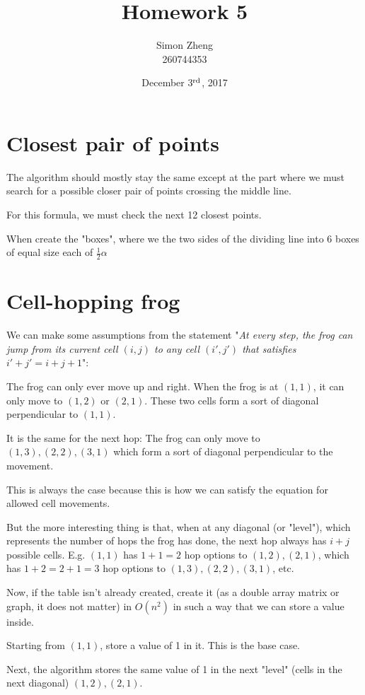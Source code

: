 \documentclass[11pt,letterpaper]{article}
\author{Simon Zheng\\260744353}
\title{Homework 5}
\date{December 3$^{\textnormal{rd}}$, 2017}
\begin{document}
	\maketitle
	\thispagestyle{fancy}
	
	\section{Closest pair of points}
		The algorithm should mostly stay the same except at the part where we must search for a possible closer pair of points crossing the middle line.
		
		For this formula, we must check the next 12 closest points.
		
		When create the "boxes", where we the two sides of the dividing line into 6 boxes of equal size each of $\frac{1}{2}\alpha$
	
	\section{Cell-hopping frog}
		We can make some assumptions from the statement "\textit{At every step, the frog can jump from its current cell $(i, j)$ to any cell $(i\prime , j\prime)$ that satisfies $i\prime + j\prime = i + j + 1$}":
		
		The frog can only ever move up and right.
		When the frog is at $(1,1)$, it can only move to $(1,2)$ or $(2,1)$. These two cells form a sort of diagonal perpendicular to $(1,1)$.
		
		It is the same for the next hop:
		The frog can only move to $(1,3), (2,2), (3,1)$ which form a sort of diagonal perpendicular to the movement.
		
		This is always the case because this is how we can satisfy the equation for allowed cell movements.
		
		But the more interesting thing is that, when at any diagonal (or "level"), which represents the number of hops the frog has done, the next hop always has $i + j$ possible cells. E.g. $(1,1)$ has $1+1=2$ hop options to $(1,2), (2,1)$, which has $1+2=2+1=3$ hop options to $(1,3), (2,2), (3,1)$, etc.
		
		Now, if the table isn't already created, create it (as a double array matrix or graph, it does not matter) in $O(n^2)$ in such a way that we can store a value inside.
		 
		Starting from $(1,1)$, store a value of 1 in it.
		This is the base case.
		
		Next, the algorithm stores the same value of 1 in the next "level" (cells in the next diagonal) $(1,2), (2,1)$.
		
\end{document}
